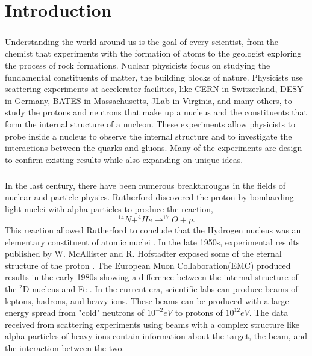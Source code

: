
\chapter{Introduction}\paragraph{}Understanding the world around us is the goal of every scientist, from the chemist that experiments with the formation of atoms to the geologist exploring the process of rock formations. Nuclear physicists focus on studying the fundamental constituents of matter, the building blocks of nature. Physicists use scattering experiments at accelerator facilities, like CERN in Switzerland, DESY in Germany, BATES in Massachusetts, JLab in Virginia, and many others, to study the protons and neutrons that make up a nucleus and the constituents that form the internal structure of a nucleon. These experiments allow physicists to probe inside a nucleus to observe the internal structure and to investigate the interactions between the quarks and gluons. Many of the experiments are design to confirm existing results while also expanding on unique ideas.
\paragraph{}In the last century, there have been numerous breakthroughs in the fields of nuclear and particle physics. Rutherford discovered the proton by bombarding light nuclei with alpha particles to produce the reaction,  
	\begin{equation}
	^{14}N + ^4He \rightarrow ^{17}O + p.
	\end{equation}
This reaction allowed Rutherford to conclude that the Hydrogen nucleus was an elementary constituent of atomic nuclei \cite{PnN}. In the late 1950s, experimental results published by W. McAllister and R. Hofstadter exposed some of the eternal structure of the proton \cite{Flay,Hof}. The European Muon Collaboration(EMC) produced results in the early 1980s showing a difference between the internal structure of the $^2$D nucleus and Fe \cite{seeley,CC}. In the current era, scientific labs can produce beams of leptons, hadrons, and heavy ions. These beams can be produced with a large energy spread from "cold" neutrons of $10^{-2}eV$ to protons of $10^{12}eV$. The data received from scattering experiments using beams with a complex structure like alpha particles of heavy ions contain information about the target, the beam, and the interaction between the two. 
